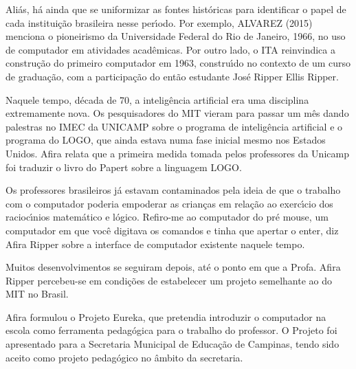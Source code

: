\documentclass[
12pt,		%
openright,	%
twoside,  %
a4paper,			%
chapter=TITLE,		%
english,			%
french,				%
spanish,			%
brazil				%
]{USPSC-classe/USPSC}
\begin{document}
Ali\'as, h\'a ainda que se uniformizar as fontes hist\'oricas para identificar o papel de cada institui\c{c}\~ao brasileira nesse per\'{\i}odo. Por exemplo,  ALVAREZ (2015) menciona o pioneirismo da Universidade Federal do Rio de Janeiro, 1966, no uso de computador em atividades acad\^emicas. Por outro lado, o ITA reinvindica a constru\c{c}\~ao do primeiro computador em 1963, constru\'{\i}do no contexto de um curso de gradua\c{c}\~ao, com a participa\c{c}\~ao do ent\~ao estudante Jos\'e Ripper Ellis Ripper.









Naquele tempo, d\'ecada de 70, a intelig\^encia artificial era uma disciplina extremamente nova. Os pesquisadores do MIT vieram para passar um m\^es dando palestras no IMEC da UNICAMP sobre o programa de intelig\^encia artificial e o programa do LOGO, que ainda estava numa fase inicial mesmo nos Estados Unidos. Afira relata que a primeira medida tomada pelos professores da Unicamp foi traduzir o livro do Papert sobre a linguagem LOGO.









Os professores brasileiros j\'a estavam contaminados pela ideia de que o trabalho com o computador poderia empoderar as crian\c{c}as em rela\c{c}\~ao ao exerc\'{\i}cio dos racioc\'{\i}nios matem\'atico e l\'ogico. \textquotedbl Refiro-me ao computador do pr\'e mouse, um computador em que voc\^e digitava os comandos e tinha que apertar o enter\textquotedbl , diz Afira Ripper sobre a interface de computador existente naquele tempo.









Muitos desenvolvimentos se seguiram depois, at\'e o ponto em que a Profa. Afira Ripper percebeu-se em condi\c{c}\~oes de estabelecer um projeto semelhante ao do MIT no Brasil.









Afira formulou o Projeto Eureka, que pretendia introduzir o computador na escola como ferramenta pedag\'ogica para o trabalho do professor. O Projeto foi apresentado para a Secretaria Municipal de Educa\c{c}\~ao de Campinas, tendo sido aceito como projeto pedag\'ogico no \^ambito da secretaria.
\end{document}
